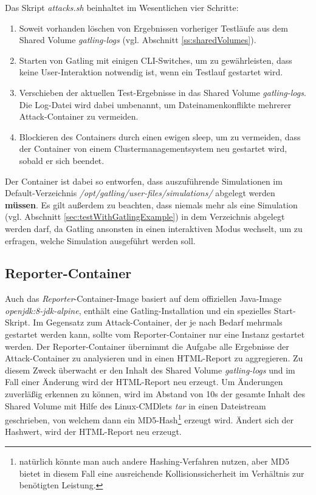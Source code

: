 Das Skript \textit{attacks.sh} beinhaltet im Wesentlichen vier Schritte:

\begin{enumerate}
	\item Soweit vorhanden l\"oschen von Ergebnissen vorheriger Testl\"aufe aus dem Shared Volume \textit{gatling-logs} (vgl. Abschnitt \ref{ss:sharedVolumes}).
	\item Starten von Gatling mit einigen \ac{CLI}-Switches, um zu gew\"ahrleisten, dass keine User-Interaktion notwendig ist, wenn ein Testlauf gestartet wird.
	\item Verschieben der aktuellen Test-Ergebnisse in das Shared Volume \textit{gatling-logs}. Die Log-Datei wird dabei umbenannt, um Dateinamenkonflikte mehrerer Attack-Container zu vermeiden.
	\item Blockieren des Containers durch einen ewigen \glqq{}sleep\grqq{}, um zu vermeiden, dass der Container von einem Clustermanagementsystem neu gestartet wird, sobald er sich beendet.
\end{enumerate}

Der Container ist dabei so entworfen, dass auszuf\"uhrende Simulationen im Default-Verzeichnis \textit{/opt/gatling/user-files/simulations/} abgelegt werden \textbf{m\"ussen}.
Es gilt au\ss{}erdem zu beachten, dass niemals mehr als eine Simulation (vgl. Abschnitt \ref{sec:testWithGatlingExample}) in dem Verzeichnis abgelegt werden darf, da Gatling ansonsten in einen interaktiven Modus wechselt, um zu erfragen, welche Simulation ausgef\"uhrt werden soll.

\subsection{Reporter-Container}

Auch das \textit{Reporter}-Container-Image basiert auf dem offiziellen Java-Image \textit{openjdk:8-jdk-alpine}, enth\"alt eine Gatling-Installation und ein spezielles Start-Skript.
Im Gegensatz zum Attack-Container, der je nach Bedarf mehrmals gestartet werden kann, sollte vom Reporter-Container nur eine Instanz gestartet werden.
Der Reporter-Container \"ubernimmt die Aufgabe alle Ergebnisse der Attack-Container zu analysieren und in einen HTML-Report zu aggregieren.
Zu diesem Zweck \"uberwacht er den Inhalt des Shared Volume \textit{gatling-logs} und im Fall einer \"Anderung wird der HTML-Report neu erzeugt.
Um \"Anderungen zuverl\"a\ss{}ig erkennen zu k\"onnen, wird im Abstand von 10s der gesamte Inhalt des Shared Volume mit Hilfe des Linux-CMDlets \textit{tar} in einen Dateistream geschrieben, von welchem dann ein MD5-Hash\footnote{nat\"urlich k\"onnte man auch andere Hashing-Verfahren nutzen, aber MD5 bietet in diesem Fall eine ausreichende Kollisionssicherheit im Verh\"altnis zur ben\"otigten Leistung.} erzeugt wird.
\"Andert sich der Hashwert, wird der HTML-Report neu erzeugt.

